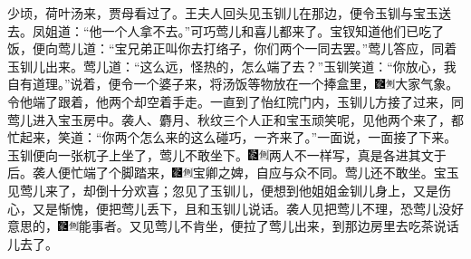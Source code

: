 少顷，荷叶汤来，贾母看过了。王夫人回头见玉钏儿在那边，便令玉钏与宝玉送去。凤姐道：“他一个人拿不去。”可巧莺儿和喜儿都来了。宝钗知道他们已吃了饭，便向莺儿道：“宝兄弟正叫你去打络子，你们两个一同去罢。”莺儿答应，同着玉钏儿出来。莺儿道：“这么远，怪热的，怎么端了去？”玉钏笑道：“你放心，我自有道理。”说着，便令一个婆子来，将汤饭等物放在一个捧盒里，{\includegraphics[width=3mm]{../Images/00006}\includegraphics[width=3mm]{../Images/00011}\footnotesize \kaishu 大家气象。}令他端了跟着，他两个却空着手走。一直到了怡红院门内，玉钏儿方接了过来，同莺儿进入宝玉房中。袭人、麝月、秋纹三个人正和宝玉顽笑呢，见他两个来了，都忙起来，笑道：“你两个怎么来的这么碰巧，一齐来了。”一面说，一面接了下来。玉钏便向一张杌子上坐了，莺儿不敢坐下。{\includegraphics[width=3mm]{../Images/00006}\includegraphics[width=3mm]{../Images/00011}\footnotesize \kaishu 两人不一样写，真是各进其文于后。}袭人便忙端了个脚踏来，{\includegraphics[width=3mm]{../Images/00006}\includegraphics[width=3mm]{../Images/00011}\footnotesize \kaishu 宝卿之婢，自应与众不同。}莺儿还不敢坐。宝玉见莺儿来了，却倒十分欢喜；忽见了玉钏儿，便想到他姐姐金钏儿身上，又是伤心，又是惭愧，便把莺儿丢下，且和玉钏儿说话。袭人见把莺儿不理，恐莺儿没好意思的，{\includegraphics[width=3mm]{../Images/00006}\includegraphics[width=3mm]{../Images/00011}\footnotesize \kaishu 能事者。}又见莺儿不肯坐，便拉了莺儿出来，到那边房里去吃茶说话儿去了。

